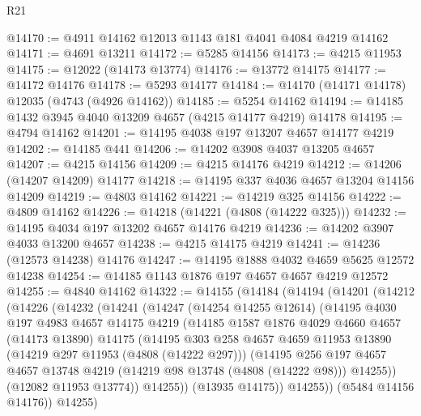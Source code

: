 \begin{lexlean}{R21}
\begin{coremodule}
@14170 := @4911 @14162 @12013 @1143 @181 @4041 @4084 @4219 @14162
@14171 := @4691 @13211
@14172 := @5285 @14156
@14173 := @4215 @11953
@14175 := @12022 (@14173 @13774)
@14176 := @13772 @14175
@14177 := @14172 @14176
@14178 := @5293 @14177
@14184 := @14170 (@14171 @14178) @12035 (@4743 (@4926 @14162))
@14185 := @5254 @14162
@14194 := @14185 @1432 @3945 @4040 @13209 @4657 (@4215 @14177 @4219) @14178
@14195 := @4794 @14162
@14201 := @14195 @4038 @197 @13207 @4657 @14177 @4219
@14202 := @14185 @441
@14206 := @14202 @3908 @4037 @13205 @4657
@14207 := @4215 @14156
@14209 := @4215 @14176 @4219
@14212 := @14206 (@14207 @14209) @14177
@14218 := @14195 @337 @4036 @4657 @13204 @14156 @14209
@14219 := @4803 @14162
@14221 := @14219 @325 @14156
@14222 := @4809 @14162
@14226 := @14218 (@14221 (@4808 (@14222 @325)))
@14232 := @14195 @4034 @197 @13202 @4657 @14176 @4219
@14236 := @14202 @3907 @4033 @13200 @4657
@14238 := @4215 @14175 @4219
@14241 := @14236 (@12573 @14238) @14176
@14247 := @14195 @1888 @4032 @4659 @5625 @12572 @14238
@14254 := @14185 @1143 @1876 @197 @4657 @4657 @4219 @12572
@14255 := @4840 @14162
@14322 := @14155
    (@14184
      (@14194
        (@14201
          (@14212
            (@14226
              (@14232
                (@14241
                  (@14247
                    (@14254 @14255 @12614)
                    (@14195
                      @4030
                      @197
                      @4983
                      @4657
                      @14175
                      @4219
                      (@14185
                        @1587
                        @1876
                        @4029
                        @4660
                        @4657
                        (@14173 @13890)
                        @14175
                        (@14195
                          @303
                          @258
                          @4657
                          @4659
                          @11953
                          @13890
                          (@14219 @297 @11953 (@4808 (@14222 @297)))
                          (@14195
                            @256
                            @197
                            @4657
                            @4657
                            @13748
                            @4219
                            (@14219 @98 @13748 (@4808 (@14222 @98)))
                            @14255))
                        (@12082 @11953 @13774))
                      @14255))
                  (@13935 @14175))
                @14255))
            (@5484 @14156 @14176))
          @14255)

\end{coremodule}
\end{lexlean}

